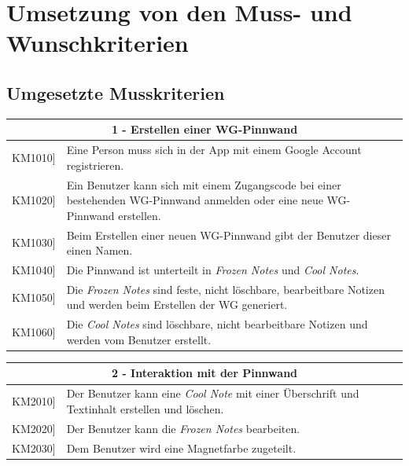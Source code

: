 \documentclass[a4paper]{scrreprt}
\begin{document}
	\chapter{Umsetzung von den Muss- und Wunschkriterien}
	\section{Umgesetzte Musskriterien}
		\begin{table}[h!]
			\centering
			\label{my-label}
			\begin{tabular}{p{2cm}p{12cm}}
				
				\multicolumn{2}{c}{\textbf{1 - Erstellen einer WG-Pinnwand}} \\ \hline
				\centering{[}KM1010{]} & Eine Person muss sich in der App mit einem Google Account registrieren.\\
				\centering{[}KM1020{]}& Ein Benutzer kann sich mit einem Zugangscode bei einer bestehenden WG-Pinnwand anmelden oder eine neue WG-Pinnwand erstellen.                                 \\
				\centering{[}KM1030{]}& Beim Erstellen einer neuen WG-Pinnwand gibt der Benutzer dieser einen Namen.\\ 
				\centering{[}KM1040{]}& Die Pinnwand ist unterteilt in \textit{Frozen Notes} und \textit{Cool Notes}.\\ 
				\centering{[}KM1050{]}& Die \textit{Frozen Notes} sind feste, nicht löschbare, bearbeitbare Notizen und werden beim Erstellen der WG generiert.\\ 
				\centering{[}KM1060{]}& Die \textit{Cool Notes} sind löschbare, nicht bearbeitbare Notizen und werden vom Benutzer erstellt.\\ 
				\hline
			\end{tabular}
		\end{table}
		
		\vspace{5mm}
		
		\begin{table}[h!]
			\centering
			\label{my-label}
			\begin{tabular}{p{2cm}p{12cm}}
				
				\multicolumn{2}{c}{\textbf{2 - Interaktion mit der Pinnwand}} \\ \hline
				\centering{[}KM2010{]} & Der Benutzer kann eine \textit{Cool Note} mit einer Überschrift und Textinhalt erstellen und löschen.\\
				\centering{[}KM2020{]}& Der Benutzer kann die \textit{Frozen Notes} bearbeiten.                                 \\
				\centering{[}KM2030{]}& Dem Benutzer wird eine Magnetfarbe zugeteilt.\\ 
				
				\hline
			\end{tabular}
		\end{table}
		
\end{document}
